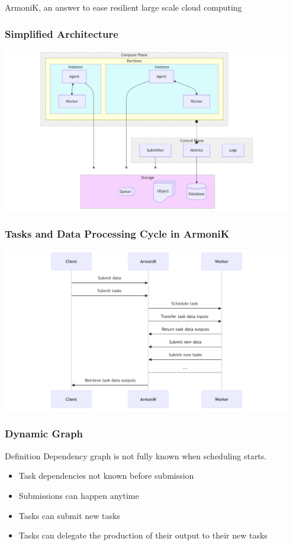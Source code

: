 \documentclass[10pt,aspectratio=1609]{beamer}
\begin{document}
\begin{section}{ArmoniK, an answer to ease resilient large scale cloud computing}
  \begin{frame}
    \frametitle{Simplified Architecture}
    \centering
    \vfill
    \includegraphics[width=0.95\textwidth]{mermaid-simplifed-architecture.png}
  \end{frame}

  \begin{frame}
    \frametitle{Tasks and Data Processing Cycle in ArmoniK}
    \centering
    \vfill
    \includegraphics[width=0.95\textwidth]{mermaid-sequence.png}
  \end{frame}

  \begin{frame}
    \frametitle{Dynamic Graph}
    \begin{block}{Definition}
      Dependency graph is not fully known when scheduling starts.
    \end{block}
    \begin{itemize}
      \item Task dependencies not known before submission
      \item Submissions can happen anytime
      \item Tasks can submit new tasks
      \item Tasks can delegate the production of their output to their new tasks
    \end{itemize}
  \end{frame}


\end{section}
\end{document}
